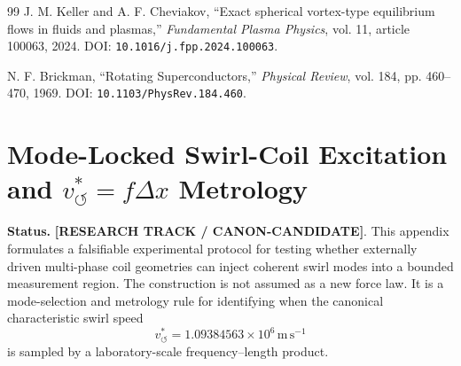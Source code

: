 \begin{thebibliography}{99}
            J. M. Keller and A. F. Cheviakov,
            ``Exact spherical vortex-type equilibrium flows in fluids and plasmas,''
            \textit{Fundamental Plasma Physics},
            vol. 11, article 100063, 2024.
            DOI: \texttt{10.1016/j.fpp.2024.100063}.
            
            N. F. Brickman,
            ``Rotating Superconductors,''
            \textit{Physical Review},
            vol. 184, pp. 460--470, 1969.
            DOI: \texttt{10.1103/PhysRev.184.460}.
        
        \end{thebibliography}
        
        
        

\providecommand{\swirlarrow}{\mathchoice{\mkern-2mu\scriptstyle\boldsymbol{\circlearrowleft}}{\mkern-2mu\scriptstyle\boldsymbol{\circlearrowleft}}{\mkern-2mu\scriptscriptstyle\boldsymbol{\circlearrowleft}}{\mkern-2mu\scriptscriptstyle\boldsymbol{\circlearrowleft}}}
\providecommand{\vswirl}{\mathbf{v}_{\!\swirlarrow}}
\providecommand{\rhoF}{{\rho_{\!f}}}
\providecommand{\rhoE}{\rho_{\!E}}
\providecommand{\rhoM}{\rho_{\!m}}
\providecommand{\rc}{{r_c}}
\providecommand{\vchar}{v_{\!\boldsymbol{\circlearrowleft}}^{\ast}}
\providecommand{\vnorm}{\vchar}

\section{Mode-Locked Swirl-Coil Excitation and \texorpdfstring{$\vchar=f\Delta x$}{v=f dx} Metrology}
\label{sec:appendix_mode_locked_swirl_coil}

\textbf{Status.} \textbf{[RESEARCH TRACK / CANON-CANDIDATE]}.
This appendix formulates a falsifiable experimental protocol for testing whether externally driven multi-phase coil geometries can inject coherent swirl modes into a bounded measurement region. The construction is not assumed as a new force law. It is a mode-selection and metrology rule for identifying when the canonical characteristic swirl speed
\begin{equation}
\vnorm = 1.09384563\times 10^{6}\,\mathrm{m\,s^{-1}}
\end{equation}
is sampled by a laboratory-scale frequency--length product.

